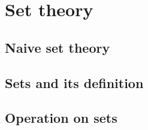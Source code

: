 \chapter{Set theory}

\section{Naive set theory}

\section{Sets and its definition}

\section{Operation on sets}

